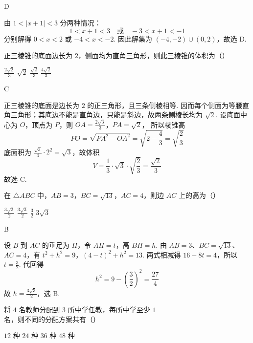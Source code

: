 \begin{answer}
D
\end{answer}

\begin{solution}
由 \(1<|x+1|<3\) 分两种情况：
\[
1<x+1<3\quad\text{或}\quad -3<x+1<-1
\]
分别解得 \(0<x<2\) 或 \(-4<x<-2\). 因此解集为 \((-4,-2)\cup(0,2)\)，故选 D.
\end{solution}

\begin{problem}
正三棱锥的底面边长为 \(2\)，侧面均为直角三角形，则此三棱锥的体积为（\quad）

\choices
    {\(\frac{2\sqrt{2}}{3}\)}
    {\(\sqrt{2}\)}
    {\(\frac{\sqrt{2}}{3}\)}
    {\(\frac{4\sqrt{2}}{3}\)}
\end{problem}

\begin{answer}
C
\end{answer}

\begin{solution}
正三棱锥的底面是边长为 \(2\) 的正三角形，且三条侧棱相等. 因而每个侧面为等腰直角三角形；其底边不能是直角边，只能是斜边，故两条侧棱长均为 \(\sqrt{2}\). 设底面中心为 \(O\)，顶点为 \(P\)，则
\(OA=\frac{2\sqrt{3}}{3}\)，\(PA=\sqrt{2}\)，
所以棱锥高
\[
PO=\sqrt{PA^2-OA^2}=\sqrt{2-\frac{4}{3}}=\sqrt{\frac{2}{3}}
\]
底面积为 \(\frac{\sqrt{3}}{4}\cdot2^2=\sqrt{3}\)，故体积
\[
V=\frac13\cdot\sqrt{3}\cdot\sqrt{\frac23}=\frac{\sqrt{2}}{3}
\]
故选 C.
\end{solution}

\begin{problem}
在 \(\triangle ABC\) 中，\(AB = 3\)，\(BC = \sqrt{13}\)，\(AC = 4\)，则边 \(AC\) 上的高为（\quad）

\choices
    {\(\frac{3\sqrt{2}}{2}\)}
    {\(\frac{3\sqrt{3}}{2}\)}
    {\(\frac{3}{2}\)}
    {\(3\sqrt{3}\)}
\end{problem}

\begin{answer}
B
\end{answer}

\begin{solution}
设 \(B\) 到 \(AC\) 的垂足为 \(H\)，令 \(AH=t\)，高 \(BH=h\). 由 \(AB=3\)、\(BC=\sqrt{13}\)、\(AC=4\)，有
\(t^2+h^2=9\)，\((4-t)^2+h^2=13\).
两式相减得 \(16-8t=4\)，所以 \(t=\frac32\). 代回得
\[
h^2=9-\left(\frac32\right)^2=\frac{27}{4}
\]
故 \(h=\frac{3\sqrt{3}}{2}\)，选 B.
\end{solution}

\begin{problem}
将 \(4\) 名教师分配到 \(3\) 所中学任教，每所中学至少 \(1\) 名，则不同的分配方案共有（\quad）

\choices
    {\(12\) 种}
    {\(24\) 种}
    {\(36\) 种}
    {\(48\) 种}
\end{problem}

